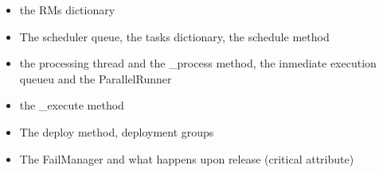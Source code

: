 %
%
%
%
%
%


\begin{itemize}
    \item the RMs dictionary
    \item The scheduler queue, the tasks dictionary, the schedule method 
    \item the processing thread and the \_process method, the inmediate execution queueu and the ParallelRunner
    \item the \_execute method 
    \item The deploy method, deployment groups
    \item The FailManager and what happens upon release (critical attribute)
\end{itemize}
